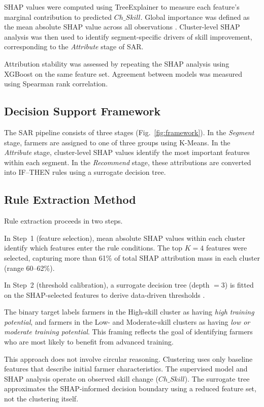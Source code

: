 \documentclass[3p,twocolumn,authoryear]{elsarticle}
\begin{document}
SHAP values were computed using TreeExplainer \citep{lundberg2017} to measure
each feature's marginal contribution to predicted $Ch\_Skill$. Global importance
was defined as the mean absolute SHAP value across all observations
\citep{lundberg2020}. Cluster-level SHAP analysis was then used to identify
segment-specific drivers of skill improvement, corresponding to the
\textit{Attribute} stage of SAR.

Attribution stability was assessed by repeating the SHAP analysis using XGBoost
\citep{chen2016} on the same feature set. Agreement between models was measured
using Spearman rank correlation.

\subsection{Decision Support Framework}

The SAR pipeline consists of three stages (Fig.~\ref{fig:framework}). In the
\textit{Segment} stage, farmers are assigned to one of three groups using
K-Means. In the \textit{Attribute} stage, cluster-level SHAP values identify the
most important features within each segment. In the \textit{Recommend} stage,
these attributions are converted into IF--THEN rules using a surrogate decision
tree.

\subsection{Rule Extraction Method}

Rule extraction proceeds in two steps.

In Step~1 (feature selection), mean absolute SHAP values within each cluster
identify which features enter the rule conditions. The top $K = 4$ features were
selected, capturing more than 61\% of total SHAP attribution mass in each
cluster (range 60--62\%).

In Step~2 (threshold calibration), a surrogate decision tree (depth $= 3$) is
fitted on the SHAP-selected features to derive data-driven thresholds
\citep{guidotti2019,molnar2022}.

The binary target labels farmers in the High-skill cluster as having
\textit{high training potential}, and farmers in the Low- and Moderate-skill
clusters as having \textit{low or moderate training potential}. This framing
reflects the goal of identifying farmers who are most likely to benefit from
advanced training.

This approach does not involve circular reasoning. Clustering uses only baseline
features that describe initial farmer characteristics. The supervised model and
SHAP analysis operate on observed skill change ($Ch\_Skill$). The surrogate tree
approximates the SHAP-informed decision boundary using a reduced feature set,
not the clustering itself.
\end{document}
